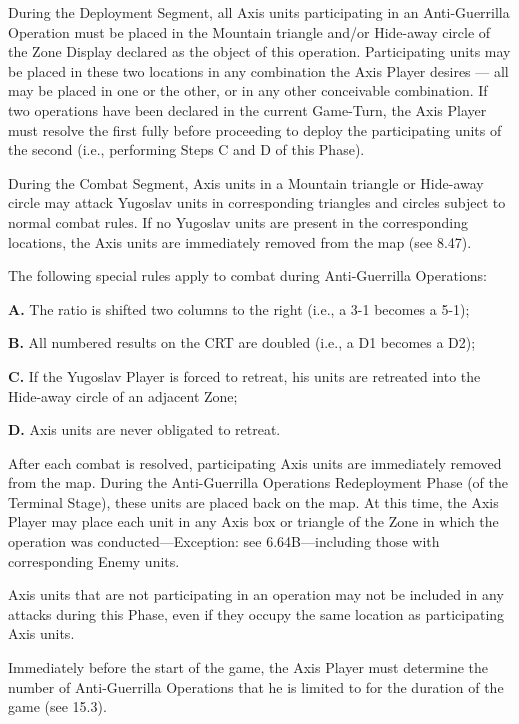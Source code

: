  During the Deployment Segment, all Axis units participating in an Anti-Guerrilla Operation must be placed in the Mountain triangle and/or Hide-away circle of the Zone Display declared as the object of this operation. Participating units may be placed in these two locations in any combination the Axis Player desires — all may be placed in one or the other, or in any other conceivable combination. If two operations have been declared in the current Game-Turn, the Axis Player must resolve the first fully before proceeding to deploy the participating units of the second (i.e., performing Steps C and D of this Phase).

 During the Combat Segment, Axis units in a Mountain triangle or Hide-away circle may attack Yugoslav units in corresponding triangles and circles subject to normal combat rules. If no Yugoslav units are present in the corresponding locations, the Axis units are immediately removed from the map (see 8.47).

 The following special rules apply to combat during Anti-Guerrilla Operations:

\textbf{A.} The ratio is shifted two columns to the right (i.e., a 3-1 becomes a 5-1);

\textbf{B.} All numbered results on the CRT are doubled (i.e., a D1 becomes a D2);

\textbf{C.} If the Yugoslav Player is forced to retreat, his units are retreated into the Hide-away circle of an adjacent Zone;

\textbf{D.} Axis units are never obligated to retreat.

 After each combat is resolved, participating Axis units are
immediately removed from the map. During the Anti-Guerrilla Operations
Redeployment Phase (of the Terminal Stage), these units are placed back on the
map. At this time, the Axis Player may place each unit in any Axis box or
triangle of the Zone in which the operation was conducted---Exception: see
6.64B---including those with corresponding Enemy units.

 Axis units that are not participating in an operation may not be included in any attacks during this Phase, even if they occupy the same location as participating Axis units.

 Immediately before the start of the game, the Axis Player must determine the number of Anti-Guerrilla Operations that he is limited to for the duration of the game (see 15.3).

